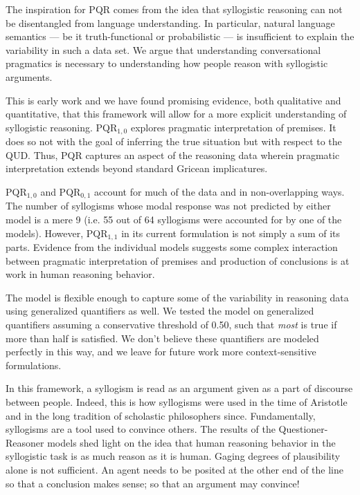 \documentclass[10pt,letterpaper]{article}
\begin{document}
The inspiration for PQR comes from the idea that syllogistic reasoning can not be disentangled from language understanding. In particular, natural language semantics --- be it truth-functional or probabilistic --- is insufficient to explain the variability in such a data set. We argue that understanding conversational pragmatics is necessary to understanding how people reason with syllogistic arguments. 

This is early work and we have found promising evidence, both qualitative and quantitative, that this framework will allow for a more explicit understanding of syllogistic reasoning. PQR$_{1,0}$ explores pragmatic interpretation of premises. It does so not with the goal of inferring the true situation but with respect to the QUD. Thus, PQR captures an aspect of the reasoning data wherein pragmatic interpretation extends beyond standard Gricean implicatures.

PQR$_{1,0}$ and PQR$_{0,1}$ account for much of the data and in non-overlapping ways. The number of syllogisms whose modal response was not predicted by either model is a mere 9 (i.e. 55 out of 64 syllogisms were accounted for by one of the models). However, PQR$_{1,1}$ in its current formulation is not simply a sum of its parts. Evidence from the individual models suggests some complex interaction between pragmatic interpretation of premises and production of conclusions is at work in human reasoning behavior. 

The model is flexible enough to capture some of the variability in reasoning data using generalized quantifiers as well. We tested the model on generalized quantifiers assuming a conservative threshold of 0.50, such that \emph{most} is true if more than half is satisfied. We don't believe these quantifiers are modeled perfectly in this way, and we leave for future work more context-sensitive formulations.

In this framework, a syllogism is read as an argument given as a part of discourse between people. Indeed, this is how syllogisms were used in the time of Aristotle and in the long tradition of scholastic philosophers since. Fundamentally, syllogisms are a tool used to convince others. The results of the Questioner-Reasoner models shed light on the idea that human reasoning behavior in the syllogistic task is as much reason as it is human. Gaging degrees of plausibility alone is not sufficient. An agent needs to be posited at the other end of the line so that a conclusion makes sense; so that an argument may convince!



\setlength{\bibleftmargin}{.125in}
\setlength{\bibindent}{-\bibleftmargin}


\end{document}
